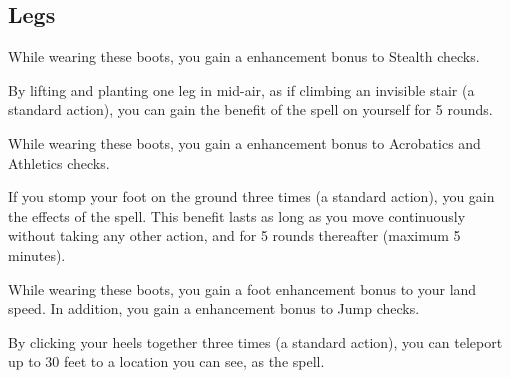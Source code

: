 
\subsection{Legs}

 While wearing these boots, you gain a  enhancement bonus to Stealth checks.


 By lifting and planting one leg in mid-air, as if climbing an invisible stair (a standard action), you can gain the benefit of the  spell on yourself for 5 rounds.


 While wearing these boots, you gain a  enhancement bonus to Acrobatics and Athletics checks.


 If you stomp your foot on the ground three times (a standard action), you gain the effects of the  spell. This benefit lasts as long as you move continuously without taking any other action, and for 5 rounds thereafter (maximum 5 minutes).


 While wearing these boots, you gain a  foot enhancement bonus to your land speed. In addition, you gain a  enhancement bonus to Jump checks.


 By clicking your heels together three times (a standard action), you can teleport up to 30 feet to a location you can see, as the  spell.

